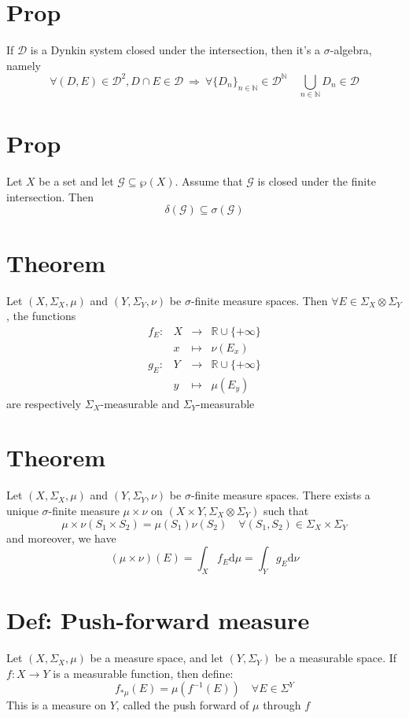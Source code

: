 \documentclass{book}
\begin{document}
\section{Prop}
If $\mathscr{D}$ is a Dynkin system closed under the intersection, then it's a $\sigma$-algebra, namely
$$\forall(D,E)\in \mathscr{D}^2, D\cap E\in \mathscr{D}\ \Rightarrow\ \forall\{D_n\}_{n\in \mathbb{N}}\in \mathscr{D}^\mathbb{N}\quad \bigcup\limits_{n\in \mathbb{N}}D_n\in \mathscr{D}$$
\section{Prop}
\label{Prop 53.7}
Let $X$ be a set and let $\mathcal{G}\subseteq\wp(X)$. Assume that $\mathcal{G}$ is closed under the finite intersection. Then $$\delta(\mathcal{G})\subseteq\sigma(\mathcal{G})$$
\section{Theorem}
Let $(X,\Sigma_X,\mu)$ and $(Y,\Sigma_Y,\nu)$ be $\sigma$-finite measure spaces. Then $\forall E\in \Sigma_X\otimes\Sigma_Y$, the functions
$$\begin{aligned}
    f_E: &X &\rightarrow &\mathbb{R}\cup\{+\infty\}\\ &x &\mapsto &\nu(E_x)\\
    g_E: &Y &\rightarrow &\mathbb{R}\cup\{+\infty\}\\ &y &\mapsto &\mu(E_y)
\end{aligned}$$
are respectively $\Sigma_X$-measurable and $\Sigma_Y$-measurable
\section{Theorem}
Let $(X,\Sigma_X,\mu)$ and $(Y,\Sigma_Y,\nu)$ be $\sigma$-finite measure spaces. There exists a unique $\sigma$-finite measure $\mu\times\nu$ on $(X\times Y,\Sigma_X\otimes\Sigma_Y)$ such that
$$\mu\times\nu(S_1\times S_2)=\mu(S_1)\nu(S_2)\quad \forall(S_1,S_2)\in\Sigma_X\times \Sigma_Y$$
and moreover, we have 
$$(\mu\times\nu)(E)=\int_Xf_E\text{d}\mu=\int_Yg_E\text{d}\nu$$
\section{Def: Push-forward measure}
Let $(X,\Sigma_X,\mu)$ be a measure space, and let $(Y,\Sigma_Y)$ be a measurable space. If $f:X\rightarrow Y$ is a measurable function, then define:
$$f_{*\mu}(E)=\mu(f^{-1}(E))\quad \forall E\in \Sigma^Y$$
This is a measure on $Y$, called the push forward of $\mu$ through $f$
\end{document}
